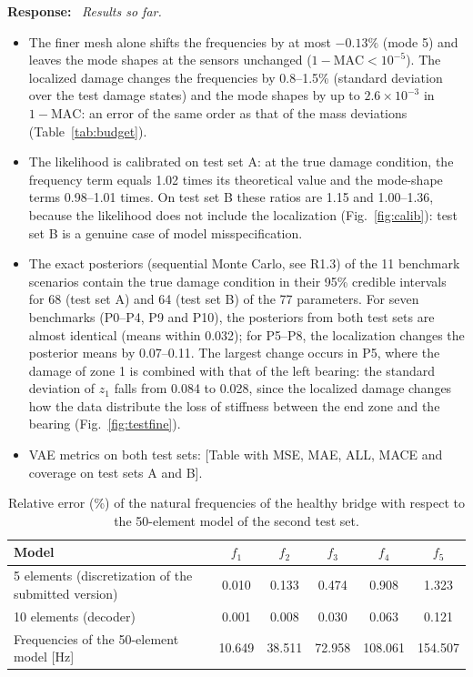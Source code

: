 \documentclass[11pt]{article}
\newenvironment{response}{\par\smallskip\noindent\color{resp}\textbf{Response:}\ }{\par}
\newcommand{\tbd}[1]{\textcolor{note}{\textsf{[#1]}}}
\begin{document}
\begin{response}
\textit{Results so far.}
\begin{itemize}[leftmargin=*]
\item The finer mesh alone shifts the frequencies by at most $-0.13\%$ (mode 5) and leaves the mode shapes at the sensors
unchanged ($1-\mathrm{MAC}<10^{-5}$). The localized damage changes the frequencies by 0.8--1.5\% (standard deviation over
the test damage states) and the mode shapes by up to $2.6\times10^{-3}$ in $1-\mathrm{MAC}$: an error of the same order
as that of the mass deviations (Table~\ref{tab:budget}).
\item The likelihood is calibrated on test set A: at the true damage condition, the frequency term equals 1.02 times its
theoretical value and the mode-shape terms 0.98--1.01 times. On test set B these ratios are 1.15 and 1.00--1.36,
because the likelihood does not include the localization (Fig.~\ref{fig:calib}): test set B is a genuine case of model
misspecification.
\item The exact posteriors (sequential Monte Carlo, see R1.3) of the 11 benchmark scenarios contain the true damage
condition in their 95\% credible intervals for 68 (test set A) and 64 (test set B) of the 77 parameters. For seven
benchmarks (P0--P4, P9 and P10), the posteriors from both test sets are almost identical (means within 0.032); for
P5--P8, the localization changes the posterior means by 0.07--0.11. The largest change occurs in P5, where the damage of zone 1
is combined with that of the left bearing: the standard deviation of $z_1$ falls from 0.084 to 0.028, since the localized damage
changes how the data distribute the loss of stiffness between the end zone and the bearing (Fig.~\ref{fig:testfine}).
\item VAE metrics on both test sets: \tbd{Table with MSE, MAE, ALL, MACE and coverage on test sets A and B}.
\end{itemize}
\end{response}

\begin{table}[H]
\centering\small
\caption{Relative error (\%) of the natural frequencies of the healthy bridge with respect to the 50-element model of
the second test set.}
\label{tab:mesh}
\begin{tabular}{lccccc}
\toprule
Model & $f_1$ & $f_2$ & $f_3$ & $f_4$ & $f_5$ \\
\midrule
5 elements (discretization of the submitted version) & 0.010 & 0.133 & 0.474 & 0.908 & 1.323 \\
10 elements (decoder) & 0.001 & 0.008 & 0.030 & 0.063 & 0.121 \\
\midrule
Frequencies of the 50-element model [Hz] & 10.649 & 38.511 & 72.958 & 108.061 & 154.507 \\
\bottomrule
\end{tabular}
\end{table}
\end{document}
